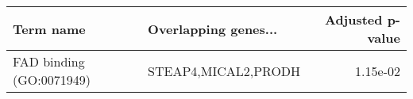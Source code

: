 \begin{tabular}{llr}
\toprule
               Term name & Overlapping genes... &  Adjusted p-value \\
\midrule
FAD binding (GO:0071949) &  STEAP4,MICAL2,PRODH &          1.15e-02 \\
\bottomrule
\end{tabular}
